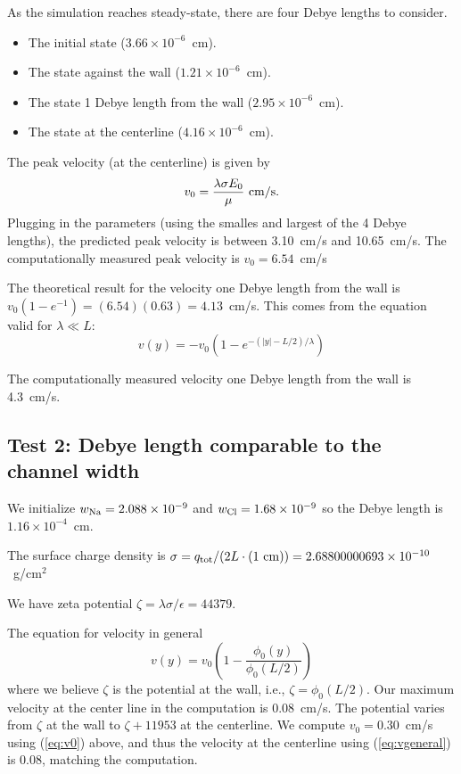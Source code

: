 \documentclass[final]{siamltex}
\begin{document}
As the simulation reaches
steady-state, there are four Debye lengths to consider.
\begin{itemize}
\item The initial state ($3.66\times 10^{-6}$~cm).
\item The state against the wall ($1.21\times 10^{-6}$~cm).
\item The state 1 Debye length from the wall ($2.95\times 10^{-6}$~cm).
\item The state at the centerline ($4.16\times 10^{-6}$~cm).
\end{itemize}
The peak velocity (at the centerline) is given by
\begin{equation}
v_0 = \frac{\lambda\sigma E_0}{\mu} ~ {\rm cm/s}.\label{eq:v0}
\end{equation}
Plugging in the parameters (using the smalles and largest of the 4 Debye lengths),
the predicted peak velocity is between 
3.10~cm/s and 10.65~cm/s.  The computationally measured peak velocity 
is $v_0 = 6.54$~cm/s

The theoretical result for the velocity one Debye length from the wall
is $v_0 (1-e^{-1}) = (6.54)(0.63) = 4.13$~cm/s.
This comes from the equation valid for $\lambda \ll L$:
\begin{equation}
v(y) = -v_0(1-e^{-(|y|-L/2)/\lambda})
\end{equation}

The computationally measured velocity one Debye length from the wall is 4.3~cm/s.  

\subsection{Test 2: Debye length comparable to the channel width}
We initialize $w_{\rm Na} = 2.088\times 10^{-9}$ and
$w_{\rm Cl} = 1.68\times 10^{-9}$ so the Debye length is
$1.16\times 10^{-4}$~cm.

The surface charge density
is $\sigma = q_{\rm tot} / (2L\cdot (1~{\rm cm})) = 2.68800000693\times 10^{-10}$~g/cm$^2$

We have zeta potential $\zeta = \lambda\sigma/\epsilon = 44379$.

The equation for velocity in general 
\begin{equation}
v(y) = v_0\left(1 - \frac{\phi_0(y)}{\phi_0(L/2)}\right)\label{eq:vgeneral}
\end{equation}
where we believe $\zeta$ is the potential at the wall, i.e., $\zeta=\phi_0(L/2)$.
Our maximum velocity at the center line in the computation is 0.08~cm/s.
The potential varies from $\zeta$ at the wall to $\zeta+11953$ at the centerline.
We compute $v_0=0.30$~cm/s using (\ref{eq:v0}) above, and thus the velocity at the 
centerline using (\ref{eq:vgeneral}) is $0.08$, matching the computation.
\end{document}
